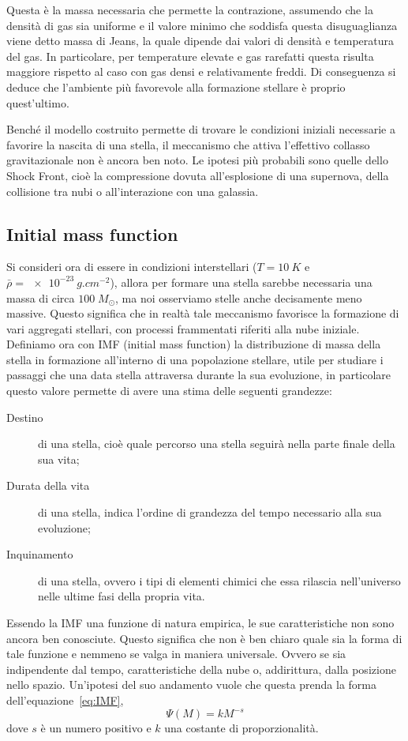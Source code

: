 Questa è la massa necessaria che permette la contrazione, assumendo che la densità di gas sia uniforme e il valore minimo che soddisfa questa disuguaglianza viene detto massa di Jeans, la quale dipende dai valori di densità e temperatura del gas. In particolare, per temperature elevate e gas rarefatti questa risulta maggiore rispetto al caso con gas densi e relativamente freddi. Di conseguenza si deduce che l'ambiente più favorevole alla formazione stellare è proprio quest'ultimo.

Benché il modello costruito permette di trovare le condizioni iniziali necessarie a favorire la nascita di una stella, il meccanismo che attiva l'effettivo collasso gravitazionale non è ancora ben noto. Le ipotesi più probabili sono quelle dello Shock Front, cioè la compressione dovuta all'esplosione di una supernova, della collisione tra nubi o all'interazione con una galassia.
\subsection{Initial mass function}
Si consideri ora di essere in condizioni interstellari ($T = \SI{10}{K}$ e $ \bar \rho = \SI{e-23}{g.cm^{-2}} $), allora per formare una stella sarebbe necessaria una massa di circa $100 \;M_\odot $, ma noi osserviamo stelle anche decisamente meno massive. Questo significa che in realtà tale meccanismo favorisce la formazione di vari aggregati stellari, con processi frammentati riferiti alla nube iniziale. Definiamo ora con IMF (initial mass function) la distribuzione di massa della stella in formazione all'interno di una popolazione stellare, utile per studiare i passaggi che una data stella attraversa durante la sua evoluzione, in particolare questo valore permette di avere una stima delle seguenti grandezze:
\begin{description}
    \item[Destino]di una stella, cioè quale percorso una stella seguirà nella parte finale della sua vita;
    \item[Durata della vita]di una stella, indica l'ordine di grandezza del tempo necessario alla sua evoluzione;
    \item[Inquinamento]di una stella, ovvero i tipi di elementi chimici che essa rilascia nell'universo nelle ultime fasi della propria vita.
\end{description}

Essendo la IMF una funzione di natura empirica, le sue caratteristiche non sono ancora ben conosciute. Questo significa che non è ben chiaro quale sia la forma di tale funzione e nemmeno se valga in maniera universale. Ovvero se sia indipendente dal tempo, caratteristiche della nube o, addirittura, dalla posizione nello spazio. Un'ipotesi del suo andamento vuole che questa prenda la forma dell'equazione~\ref{eq:IMF},
\begin{equation}
    \Psi(M) = k M^{-s}
    \label{eq:IMF}
\end{equation}
dove $s$ è un numero positivo e $k$ una costante di proporzionalità.

